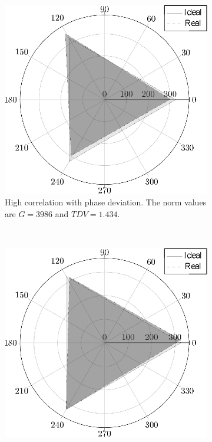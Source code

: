             \begin{figure}
                \centering
                \begin{subfigure}[b]{0.48\textwidth}
                    \includegraphics[width=\textwidth]{Unblance_EPS_Pics/EPS_images/rombus.eps}
                    \caption{\centering High correlation with phase deviation. The norm values are $G=3986$ and $TDV=1.434$.}
                    \label{fig:cases_A}
                \end{subfigure}
                ~ %
                \begin{subfigure}[b]{0.48\textwidth}
                    \includegraphics[width=\textwidth]{Unblance_EPS_Pics/EPS_images/triangle.eps}

\end{subfigure}
\end{figure}

